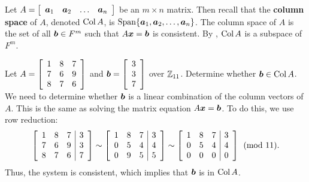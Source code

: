 Let $A = \mtx{rrrr}{\bb a_1 & \bb a_2 & \ldots & \bb a_n}$ be an $m\times n$ matrix. Then recall that the \textbf{column space} of $A$, denoted $\col A$, is $\Span\{\bb a_1, \bb a_2, \ldots, \bb a_n\}$. The column space of $A$ is the set of all $\bb b\in F^m$ such that $A\bb x = \bb b$ is consistent. By , $\col A$ is a subspace of $F^m$.\\

\begin{Exam} Let $A = \mtx{rrr}{1&8&7\\7&6&9\\8&7&6}$ and $\bb b = \vr{3\\3\\7}$ over $\Z_{11}$. Determine whether $\bb b \in \col A$.\\

We need to determine whether $\bb b$ is a linear combination of the column vectors of $A$. This is the same as solving the matrix equation $A\bb x = \bb b$. To do this, we use row reduction:
\[\mtx{rrr|r}{1&8&7&3\\7&6&9&3\\8&7&6&7} \sim \mtx{rrr|r}{1&8&7&3\\0&5&4&4\\0&9&5&5} \sim \mtx{rrr|r}{1&8&7&3\\0&5&4&4\\0&0&0&0} \pmod{11}.\] Thus, the system is consistent, which implies that $\bb b$ is in $\col A$.
\end{Exam}\vs

